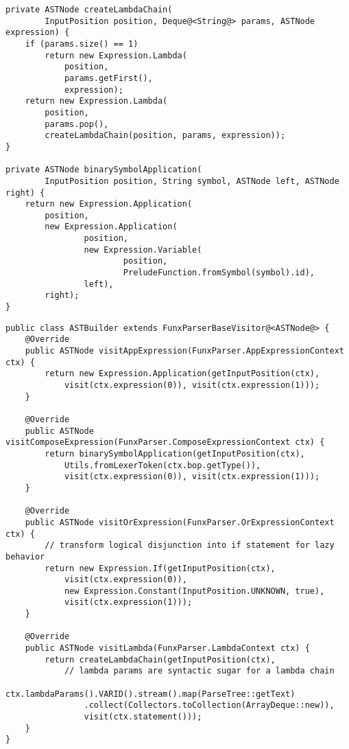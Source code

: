 \begin{lstlisting}[caption={Metodi per astrazioni annidate e operatori simbolici binari}, style=javaCode, label={lst:5-auxiliary-methods-java}]
private ASTNode createLambdaChain(
        InputPosition position, Deque@<String@> params, ASTNode expression) {
    if (params.size() == 1)
        return new Expression.Lambda(
            position,
            params.getFirst(),
            expression);
    return new Expression.Lambda(
        position,
        params.pop(),
        createLambdaChain(position, params, expression));
}

private ASTNode binarySymbolApplication(
        InputPosition position, String symbol, ASTNode left, ASTNode right) {
    return new Expression.Application(
        position,
        new Expression.Application(
                position,
                new Expression.Variable(
                        position,
                        PreludeFunction.fromSymbol(symbol).id),
                left),
        right);
}
\end{lstlisting}
\vspace{4mm}
\begin{lstlisting}[caption={Alcuni metodi \textit{visit} di \texttt{ASTBuilder}}, style=javaCode, label={lst:5-astbuilder-java}]
public class ASTBuilder extends FunxParserBaseVisitor@<ASTNode@> {
    @Override
    public ASTNode visitAppExpression(FunxParser.AppExpressionContext ctx) {
        return new Expression.Application(getInputPosition(ctx),
            visit(ctx.expression(0)), visit(ctx.expression(1)));
    }

    @Override
    public ASTNode visitComposeExpression(FunxParser.ComposeExpressionContext ctx) {
        return binarySymbolApplication(getInputPosition(ctx),
            Utils.fromLexerToken(ctx.bop.getType()),
            visit(ctx.expression(0)), visit(ctx.expression(1)));
    }
    
    @Override
    public ASTNode visitOrExpression(FunxParser.OrExpressionContext ctx) {
        // transform logical disjunction into if statement for lazy behavior
        return new Expression.If(getInputPosition(ctx),
            visit(ctx.expression(0)),
            new Expression.Constant(InputPosition.UNKNOWN, true),
            visit(ctx.expression(1)));
    }

    @Override
    public ASTNode visitLambda(FunxParser.LambdaContext ctx) {
        return createLambdaChain(getInputPosition(ctx),
            // lambda params are syntactic sugar for a lambda chain
            ctx.lambdaParams().VARID().stream().map(ParseTree::getText)
                .collect(Collectors.toCollection(ArrayDeque::new)),
                visit(ctx.statement()));
    }
}    
\end{lstlisting}

